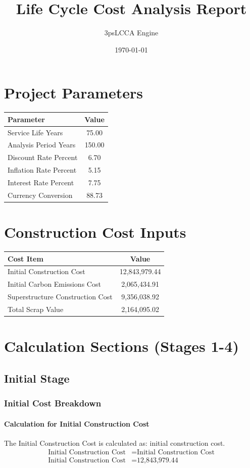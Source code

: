 \documentclass{article}
\title{Life Cycle Cost Analysis Report}
\author{3psLCCA Engine}
\date{\today}
\begin{document}
\maketitle
\section{Project Parameters}
\begin{longtable}{lc}
\toprule
\textbf{Parameter} & \textbf{Value} \\
\midrule
Service Life Years & 75.00 \\
Analysis Period Years & 150.00 \\
Discount Rate Percent & 6.70 \\
Inflation Rate Percent & 5.15 \\
Interest Rate Percent & 7.75 \\
Currency Conversion & 88.73 \\
\bottomrule
\end{longtable}
\section{Construction Cost Inputs}
\begin{longtable}{lc}
\toprule
\textbf{Cost Item} & \textbf{Value} \\
\midrule
Initial Construction Cost & 12,843,979.44 \\
Initial Carbon Emissions Cost & 2,065,434.91 \\
Superstructure Construction Cost & 9,356,038.92 \\
Total Scrap Value & 2,164,095.02 \\
\bottomrule
\end{longtable}
\section{Calculation Sections (Stages 1-4)}
\subsection{Initial Stage}
\subsubsection{Initial Cost Breakdown}
 \paragraph{Calculation for Initial Construction Cost} 
The Initial Construction Cost is calculated as: initial construction cost.
\begin{align*}
 \text{Initial Construction Cost} &= \text{Initial Construction Cost} \\
 \text{Initial Construction Cost} &= \text{12,843,979.44} \\
\end{align*}
\end{document}
